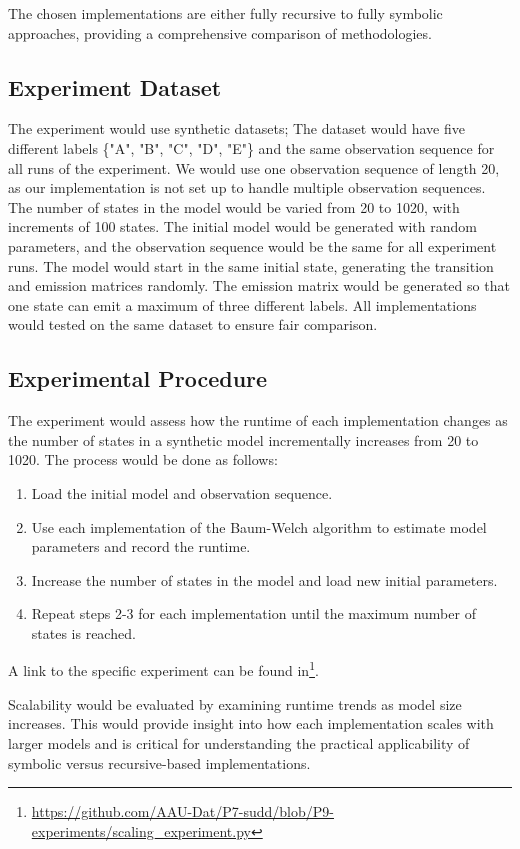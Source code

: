 The chosen implementations are either fully recursive to fully symbolic approaches, providing a comprehensive comparison of methodologies.

\subsection{Experiment Dataset}
The experiment would use synthetic datasets; The dataset would have five different labels \{"A", "B", "C", "D", "E"\} and the same observation sequence for all runs of the experiment. 
We would use one observation sequence of length 20, as our implementation is not set up to handle multiple observation sequences.
The number of states in the model would be varied from 20 to 1020, with increments of 100 states.
The initial model would be generated with random parameters, and the observation sequence would be the same for all experiment runs.
The model would start in the same initial state, generating the transition and emission matrices randomly.
The emission matrix would be generated so that one state can emit a maximum of three different labels.
All implementations would tested on the same dataset to ensure fair comparison.

\subsection{Experimental Procedure}
The experiment would assess how the runtime of each implementation changes as the number of states in a synthetic model incrementally increases from 20 to 1020. 
The process would be done as follows:

\begin{enumerate}
\item Load the initial model and observation sequence.
\item Use each implementation of the Baum-Welch algorithm to estimate model parameters and record the runtime.
\item Increase the number of states in the model and load new initial parameters.
\item Repeat steps 2-3 for each implementation until the maximum number of states is reached.
\end{enumerate}

A link to the specific experiment can be found in\footnote{\url{https://github.com/AAU-Dat/P7-sudd/blob/P9-experiments/scaling_experiment.py}}. 

Scalability would be evaluated by examining runtime trends as model size increases.
This would provide insight into how each implementation scales with larger models and is critical for understanding the practical applicability of symbolic versus recursive-based implementations.

